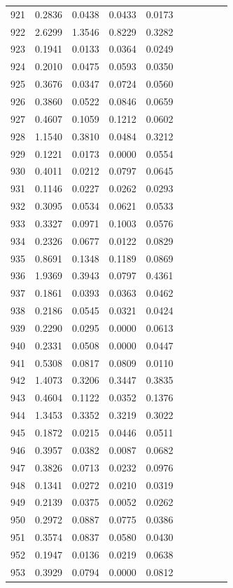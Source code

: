 \begin{table}
\begin{tabular}{cccccccccc}
921& 0.2836& 0.0438& 0.0433& 0.0173\\ 
922& 2.6299& 1.3546& 0.8229& 0.3282\\ 
923& 0.1941& 0.0133& 0.0364& 0.0249\\ 
924& 0.2010& 0.0475& 0.0593& 0.0350\\ 
925& 0.3676& 0.0347& 0.0724& 0.0560\\ 
926& 0.3860& 0.0522& 0.0846& 0.0659\\ 
927& 0.4607& 0.1059& 0.1212& 0.0602\\ 
928& 1.1540& 0.3810& 0.0484& 0.3212\\ 
929& 0.1221& 0.0173& 0.0000& 0.0554\\ 
930& 0.4011& 0.0212& 0.0797& 0.0645\\ 
931& 0.1146& 0.0227& 0.0262& 0.0293\\ 
932& 0.3095& 0.0534& 0.0621& 0.0533\\ 
933& 0.3327& 0.0971& 0.1003& 0.0576\\ 
934& 0.2326& 0.0677& 0.0122& 0.0829\\ 
935& 0.8691& 0.1348& 0.1189& 0.0869\\ 
936& 1.9369& 0.3943& 0.0797& 0.4361\\ 
937& 0.1861& 0.0393& 0.0363& 0.0462\\ 
938& 0.2186& 0.0545& 0.0321& 0.0424\\ 
939& 0.2290& 0.0295& 0.0000& 0.0613\\ 
940& 0.2331& 0.0508& 0.0000& 0.0447\\ 
941& 0.5308& 0.0817& 0.0809& 0.0110\\ 
942& 1.4073& 0.3206& 0.3447& 0.3835\\ 
943& 0.4604& 0.1122& 0.0352& 0.1376\\ 
944& 1.3453& 0.3352& 0.3219& 0.3022\\ 
945& 0.1872& 0.0215& 0.0446& 0.0511\\ 
946& 0.3957& 0.0382& 0.0087& 0.0682\\ 
947& 0.3826& 0.0713& 0.0232& 0.0976\\ 
948& 0.1341& 0.0272& 0.0210& 0.0319\\ 
949& 0.2139& 0.0375& 0.0052& 0.0262\\ 
950& 0.2972& 0.0887& 0.0775& 0.0386\\ 
951& 0.3574& 0.0837& 0.0580& 0.0430\\ 
952& 0.1947& 0.0136& 0.0219& 0.0638\\ 
953& 0.3929& 0.0794& 0.0000& 0.0812\\ 

\end{tabular}
\end{table}
